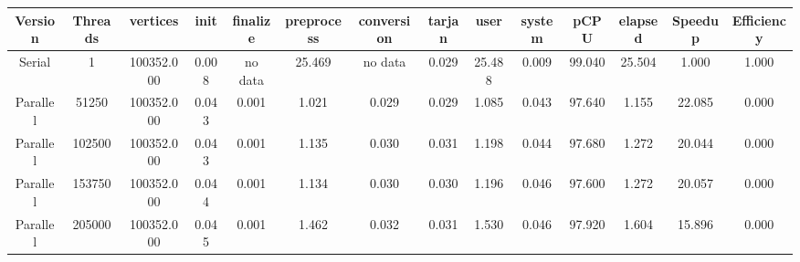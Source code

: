 \begin{tabular}{|c|c|c|c|c|c|c|c|c|c|c|c|c|c|}
\toprule
 Version &  Threads &   vertices &  init & finalize &  preprocess & conversion &  tarjan &   user &  system &   pCPU &  elapsed &  Speedup &  Efficiency \\
\midrule
  Serial &        1 & 100352.000 & 0.008 &  no data &      25.469 &    no data &   0.029 & 25.488 &   0.009 & 99.040 &   25.504 &    1.000 &       1.000 \\
Parallel &    51250 & 100352.000 & 0.043 &    0.001 &       1.021 &      0.029 &   0.029 &  1.085 &   0.043 & 97.640 &    1.155 &   22.085 &       0.000 \\
Parallel &   102500 & 100352.000 & 0.043 &    0.001 &       1.135 &      0.030 &   0.031 &  1.198 &   0.044 & 97.680 &    1.272 &   20.044 &       0.000 \\
Parallel &   153750 & 100352.000 & 0.044 &    0.001 &       1.134 &      0.030 &   0.030 &  1.196 &   0.046 & 97.600 &    1.272 &   20.057 &       0.000 \\
Parallel &   205000 & 100352.000 & 0.045 &    0.001 &       1.462 &      0.032 &   0.031 &  1.530 &   0.046 & 97.920 &    1.604 &   15.896 &       0.000 \\
\bottomrule
\end{tabular}
